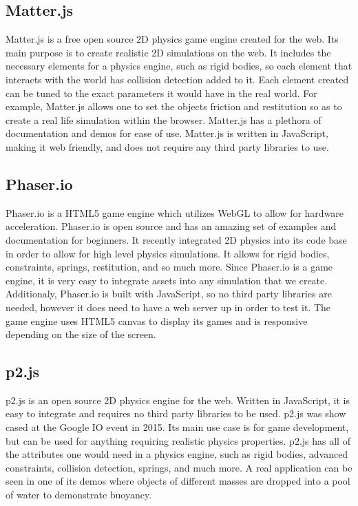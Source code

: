 \documentclass[capstone.tex]{subfiles}
\begin{document}
\subsection{Matter.js}

Matter.js is a free open source 2D physics game engine created for the web. Its main purpose is to create realistic 2D simulations on the web. It includes the necessary elements for a physics engine, such as rigid bodies, so each element that interacts with the world has collision detection added to it. Each element created can be tuned to the exact parameters it would have in the real world. For example, Matter.js allows one to set the objects friction and restitution so as to create a real life simulation within the browser. Matter.js has a plethora of documentation and demos for ease of use. Matter.js is written in JavaScript, making it web friendly, and does not require any third party libraries to use. 

\subsection{Phaser.io}

Phaser.io is a HTML5 game engine which utilizes WebGL to allow for hardware acceleration. Phaser.io is open source and has an amazing set of examples and documentation for beginners. It recently integrated 2D physics into its code base in order to allow for high level physics simulations. It allows for rigid bodies, constraints, springs, restitution, and so much more. Since Phaser.io is a game engine, it is very easy to integrate assets into any simulation that we create. Additionaly, Phaser.io is built with JavaScript, so no third party libraries are needed, however it does need to have a web server up in order to test it. The game engine uses HTML5 canvas to display its games and is responsive depending on the size of the screen.

\subsection{p2.js}

p2.js is an open source 2D physics engine for the web. Written in JavaScript, it is easy to integrate and requires no third party libraries to be used. p2.js was show cased at the Google IO event in 2015. Its main use case is for game development, but can be used for anything requiring realistic physics properties. p2.js has all of the attributes one would need in a physics engine, such as rigid bodies, advanced constraints, collision detection, springs, and much more. A real application can be seen in one of its demos where objects of different masses are dropped into a pool of water to demonstrate buoyancy.  
\end{document}
